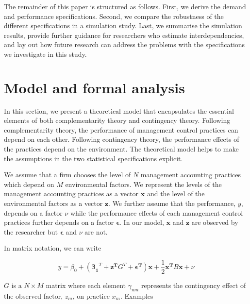 \documentclass[12pt]{article}
\begin{document}
The remainder of this paper is structured as follows. First, we derive the demand and performance specifications. Second, we compare the robustness of the different specifications in a simulation study. Last, we summarise the simulation results, provide further guidance for researchers who estimate interdependencies, and lay out how future research can address the problems with the specifications we investigate in this study.

\section{Model and formal analysis}\label{model-and-formal-analysis}

In this section, we present a theoretical model that encapsulates the essential elements of both complementarity theory and contingency theory. Following complementarity theory, the performance of management control practices can depend on each other. Following contingency theory, the performance effects of the practices depend on the environment. The theoretical model helps to make the assumptions in the two statistical specifications explicit. 

We assume that a firm chooses the level of $N$ management accounting practices which depend on $M$ environmental factors. We represent the levels of the management accounting practices as a vector $\mathbf{x}$ and the level of the environmental factors as a vector $\mathbf{z}$. We further assume that the performance, $y$, depends on a factor $\nu$ while the performance effects of each management control practices further depends on a factor $\mathbf{\epsilon}$. In our model, $\mathbf{x}$ and $\mathbf{z}$ are observed by the researcher but $\mathbf{\epsilon}$ and $\nu$ are not. 


In matrix notation, we can write

\begin{equation} \label{eq:structural-matrix}
y = \beta_0 + (\mathbf{\beta_1}^T + \mathbf{z^T} G^T + \mathbf{\epsilon^T})
     \mathbf{x} + \frac{1}{2}\mathbf{x^T} B \mathbf{x} + \nu
\end{equation}

$G$ is a $N \times M$ matrix where each element $\gamma_{nm}$ represents the contingency effect of the observed factor, $z_m$, on practice $x_m$. Examples
\end{document}
